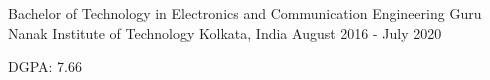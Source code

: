 

\begin{cventries}

      
  \cventry
    {Bachelor of Technology in Electronics and Communication Engineering} %
    {Guru Nanak Institute of Technology} %
    {Kolkata, India} %
    {August 2016 - July 2020} %
    {
      \begin{cvitems} %
        \item {DGPA: 7.66}
      \end{cvitems}
    }
   
\end{cventries}
